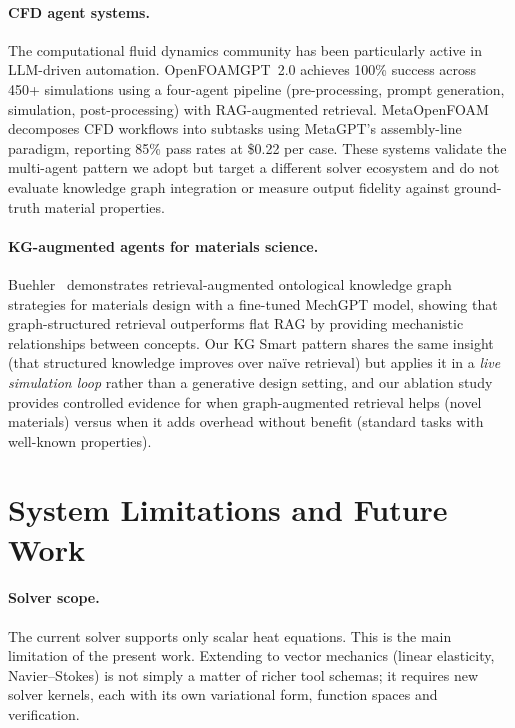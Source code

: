 \documentclass[preprint,review,12pt]{elsarticle}
\newif\ifrevisionsvisible
\newcommand{\revised}[1]{%
  \ifrevisionsvisible\textcolor{revisionred}{#1}\else#1\fi}
\begin{document}
\paragraph{CFD agent systems.}
The computational fluid dynamics community has been particularly active
in LLM-driven automation.  OpenFOAMGPT~2.0 \citep{chen2025openfoamgpt2}
achieves 100\% success across 450+ simulations using a four-agent
pipeline (pre-processing, prompt generation, simulation, post-processing)
with RAG-augmented retrieval.
MetaOpenFOAM \citep{chen2024metaopenfoam} decomposes CFD workflows into
subtasks using MetaGPT's \citep{hong2024metagpt} assembly-line paradigm,
reporting 85\% pass
rates at \$0.22 per case.
These systems validate the multi-agent pattern we adopt but target a
different solver ecosystem and do not evaluate knowledge graph
integration or measure output fidelity against ground-truth material
properties.

\paragraph{KG-augmented agents for materials science.}
Buehler~\cite{buehler2024mechgpt} demonstrates retrieval-augmented ontological
knowledge graph strategies for materials design with a fine-tuned
MechGPT model, showing that graph-structured retrieval
outperforms flat RAG by providing mechanistic relationships between
concepts.  Our KG Smart pattern shares the same insight (that structured
knowledge improves over na\"ive retrieval) but applies it in a
\emph{live simulation loop} rather than a generative design setting,
and our ablation study provides controlled evidence for when
graph-augmented retrieval helps (novel materials) versus when it adds
overhead without benefit (standard tasks with well-known properties).

\section{System Limitations and Future Work}
\label{sec:limitations}

\paragraph{Solver scope.}
The current solver supports only scalar heat equations.  \revised{This is the main limitation of the present work.  Extending to
vector mechanics (linear elasticity, Navier--Stokes) is not simply a
matter of richer tool schemas; it requires new solver kernels, each with
its own variational form, function spaces and verification.}
\end{document}
